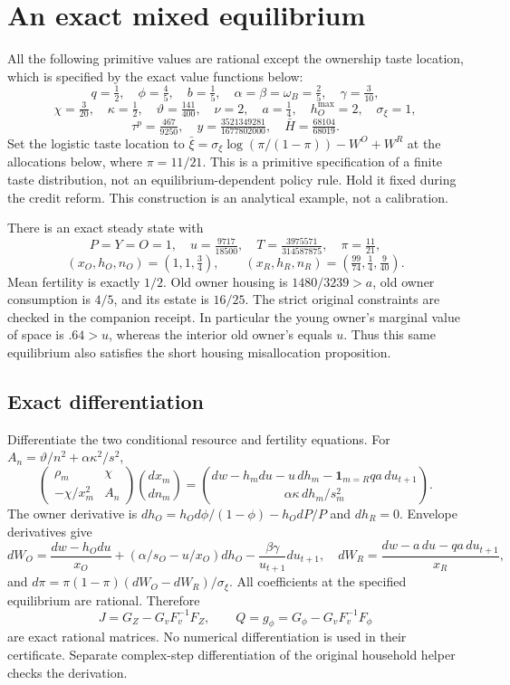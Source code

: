 \documentclass[
  11pt,
]{article}
\begin{document}
\section{An exact mixed equilibrium}\label{an-exact-mixed-equilibrium}

All the following primitive values are rational except the ownership
taste location, which is specified by the exact value functions below:
\[
 q=\tfrac12,\quad\phi=\tfrac45,\quad b=\tfrac15,\quad
 \alpha=\beta=\omega_B=\tfrac25,\quad\gamma=\tfrac3{10},
\] \[
 \chi=\tfrac3{20},\quad\kappa=\tfrac12,\quad
 \vartheta=\tfrac{141}{400},\quad\nu=2,\quad
 a=\tfrac14,\quad h_O^{\max}=2,\quad\sigma_\xi=1,
\] \[
 \tau^p=\tfrac{467}{9250},\quad
 y=\tfrac{3521349281}{1677802000},\quad
 \bar H=\tfrac{68104}{68019}.
\] Set the logistic taste location to
\(\bar\xi=\sigma_\xi\log(\pi/(1-\pi))-W^O+W^R\) at the allocations
below, where \(\pi=11/21\). This is a primitive specification of a
finite taste distribution, not an equilibrium-dependent policy rule.
Hold it fixed during the credit reform. This construction is an
analytical example, not a calibration.

There is an exact steady state with \[
 P=Y=O=1,\quad u=\tfrac{9717}{18500},\quad
 T=\tfrac{3975571}{314587875},\quad\pi=\tfrac{11}{21},
\] \[
 (x_O,h_O,n_O)=(1,1,\tfrac34),\qquad
 (x_R,h_R,n_R)=(\tfrac{99}{74},\tfrac14,\tfrac9{40}).
\] Mean fertility is exactly \(1/2\). Old owner housing is
\(1480/3239>a\), old owner consumption is \(4/5\), and its estate is
\(16/25\). The strict original constraints are checked in the companion
receipt. In particular the young owner's marginal value of space is
\(.64>u\), whereas the interior old owner's equals \(u\). Thus this same
equilibrium also satisfies the short housing misallocation proposition.

\subsection{Exact differentiation}\label{exact-differentiation}

Differentiate the two conditional resource and fertility equations. For
\(A_n=\vartheta/n^2+\alpha\kappa^2/s^2\), \[
 \begin{pmatrix}\rho_m&\chi\\-\chi/x_m^2&A_n\end{pmatrix}
 \binom{dx_m}{dn_m}
 =\binom{dw-h_mdu-u\,dh_m-\mathbf1_{m=R}qa\,du_{t+1}}
              {\alpha\kappa\,dh_m/s_m^2}.
\] The owner derivative is \(dh_O=h_Od\phi/(1-\phi)-h_OdP/P\) and
\(dh_R=0\). Envelope derivatives give \[
 dW_O=\frac{dw-h_Odu}{x_O}
 +(\alpha/s_O-u/x_O)dh_O-\frac{\beta\gamma}{u_{t+1}}du_{t+1},
 \quad dW_R=\frac{dw-a\,du-qa\,du_{t+1}}{x_R},
\] and \(d\pi=\pi(1-\pi)(dW_O-dW_R)/\sigma_\xi\). All coefficients at
the specified equilibrium are rational. Therefore \[
 J=G_Z-G_vF_v^{-1}F_Z,\qquad
 Q=g_\phi=G_\phi-G_vF_v^{-1}F_\phi
\] are exact rational matrices. No numerical differentiation is used in
their certificate. Separate complex-step differentiation of the original
household helper checks the derivation.
\end{document}
